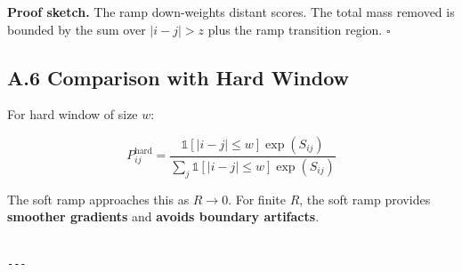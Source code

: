 \textbf{Proof sketch.} The ramp down-weights distant scores. The total mass 
removed is bounded by the sum over $|i-j| > z$ plus the ramp transition 
region. $\square$

\subsection{A.6 Comparison with Hard Window}

For hard window of size $w$:

\[
P_{ij}^{\text{hard}} = \frac{\mathbb{1}[|i-j| \le w] \exp(S_{ij})}{\sum_j \mathbb{1}[|i-j| \le w] \exp(S_{ij})}
\]

The soft ramp approaches this as $R \to 0$. For finite $R$, the soft ramp 
provides \textbf{smoother gradients} and \textbf{avoids boundary artifacts}.
\begin{lstlisting}

---
\end{lstlisting}